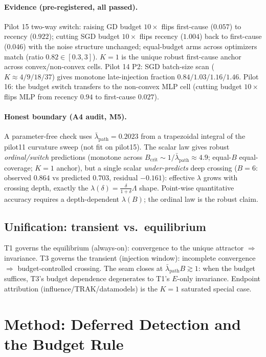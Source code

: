 \documentclass{article}
\newcommand{\Expo}{E}         %
\newcommand{\B}{B}            %
\newcommand{\lam}{\lambda}
\newcommand{\lampath}{\bar{\lam}_{\mathrm{path}}}
\begin{document}
\paragraph{Evidence (pre-registered, all passed).} Pilot 15 two-way switch: raising GD budget
$10\times$ flips first-cause ($0.057$) to recency ($0.922$); cutting SGD budget $10\times$ flips
recency ($1.004$) back to first-cause ($0.046$) with the noise structure unchanged; equal-budget
arms across optimizers match (ratio $0.82\in[0.3,3]$). $K=1$ is the unique robust first-cause
anchor across convex/non-convex cells. Pilot 14 P2: SGD batch-size scan ($K\approx4/9/18/37$)
gives monotone late-injection fraction $0.84/1.03/1.16/1.46$. Pilot 16: the budget switch
transfers to the non-convex MLP cell (cutting budget $10\times$ flips MLP from recency $0.94$ to
first-cause $0.027$).

\paragraph{Honest boundary (A4 audit, M5).} A parameter-free check uses
$\lampath=0.2023$ from a trapezoidal integral of the pilot11 curvature sweep (not fit on
pilot15). The scalar law gives robust \emph{ordinal/switch} predictions (monotone across
$\B_{\mathrm{crit}}\sim1/\lampath\approx4.9$; equal-$\B$ equal-coverage; $K{=}1$ anchor), but a
single scalar \emph{under-predicts} deep crossing ($\B=6$: observed $0.864$ vs predicted $0.703$,
residual $-0.161$): effective $\lambda$ grows with crossing depth, exactly the
$\lambda(\delta)=\frac{\delta}{1+\delta}\Lambda$ shape. Point-wise quantitative accuracy requires
a depth-dependent $\lambda(\B)$; the ordinal law is the robust claim.

\subsection{Unification: transient vs.\ equilibrium}
\label{sec:unify}
T1 governs the equilibrium (always-on): convergence to the unique attractor $\Rightarrow$
invariance. T3 governs the transient (injection window): incomplete convergence $\Rightarrow$
budget-controlled crossing. The seam closes at $\lampath\B\gtrsim1$: when the budget suffices,
T3's budget dependence degenerates to T1's $\Expo$-only invariance. Endpoint attribution
(influence/TRAK/datamodels) is the $K{=}1$ saturated special case.

\section{Method: Deferred Detection and the Budget Rule}
\label{sec:method}
\end{document}
